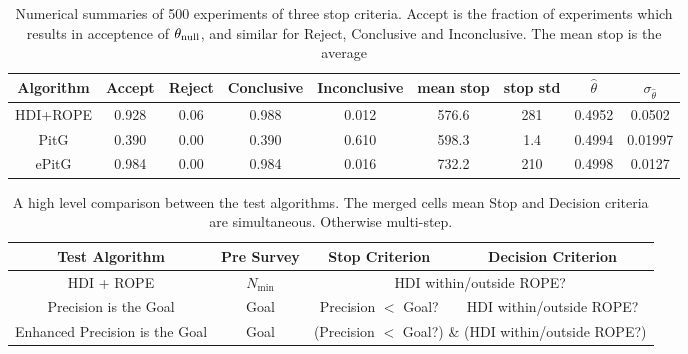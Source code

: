 \documentclass{article}
\begin{document}

\begin{table}[h!]\label{tab:bah}
  \begin{center}
  \begin{tabular}{c|c|c|c|c|c|c|c|c}
    \hline
    Algorithm & Accept & Reject & Conclusive & Inconclusive & mean stop & stop std & $\hat{\theta}$ & $\sigma_{\hat{\theta}}$\\
    \hline
    HDI+ROPE & 0.928 & 0.06 & 0.988 & 0.012 & 576.6 & 281 & 0.4952 & 0.0502 \\
    PitG & 0.390 & 0.00 & 0.390 & 0.610 & 598.3 & 1.4 & 0.4994 & 0.01997 \\
    ePitG & 0.984 & 0.00 & 0.984 & 0.016 & 732.2 & 210 & 0.4998 & 0.0127\\
    \hline
  \end{tabular}
  \caption{Numerical summaries of 500 experiments of three stop criteria. Accept
  is the fraction of experiments which results in acceptence of $\theta_{\rm null}$,
  and similar for Reject, Conclusive and Inconclusive. The mean stop is the average}
\end{center}
\end{table}


\begin{table}[h!]\label{tab:table1}
  \begin{center}
    \begin{tabular}{c|c|c|c}
      \textbf{Test Algorithm } & \textbf{Pre Survey} & \textbf{Stop Criterion} &  \textbf{Decision Criterion}\\
      \hline
      HDI + ROPE & $N_\mathrm{min}$  & \multicolumn{2}{c}{\multirow{1}{*}{HDI within/outside ROPE?}}  \\
      Precision is the Goal & Goal & Precision $<$ Goal? & HDI within/outside ROPE? \\
      Enhanced Precision is the Goal & Goal& \multicolumn{2}{c}{\multirow{1}{*}{(Precision $<$ Goal?) \& (HDI within/outside ROPE?)}}  \\
    \end{tabular}
    \caption{A high level comparison between the test algorithms.
    The merged cells mean Stop and Decision criteria are simultaneous.
    Otherwise multi-step.
    }
  \end{center}
\end{table}
\end{document}
